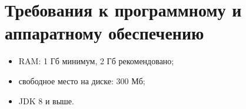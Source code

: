 \section{Требования к программному и аппаратному обеспечению} \label{sub23}

\begin{itemize}
\item{RAM: 1 Гб минимум, 2 Гб рекомендовано;}
\item{свободное место на диске: 300 Мб;}
\item{JDK 8 и выше.}
\end{itemize}
